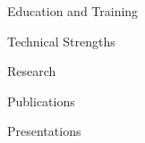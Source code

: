 \documentclass{resume} %
\begin{document}


\begin{rSection}{Education and
Training}
\end{rSection}


\begin{rSection}{Technical Strengths}


\end{rSection}



\begin{rSection}{Research}
\end{rSection}



\begin{rSection}{Publications}
\end{rSection}


\newpage
\begin{rSection}{Presentations}
\end{rSection}

\end{document}
